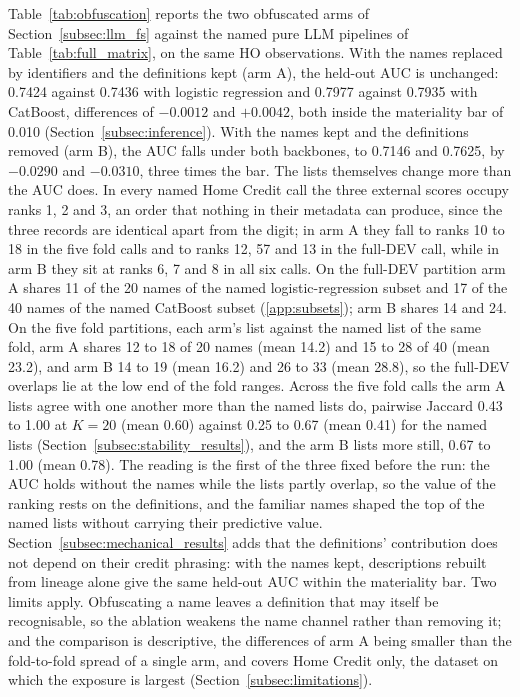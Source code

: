 \documentclass[final,5p,twocolumn]{elsarticle}
\newcommand{\Kfeat}{K}
\begin{document}
Table~\ref{tab:obfuscation} reports the two obfuscated arms of Section~\ref{subsec:llm_fs} against the named pure LLM pipelines of Table~\ref{tab:full_matrix}, on the same HO observations. With the names replaced by identifiers and the definitions kept (arm A), the held-out AUC is unchanged: 0.7424 against 0.7436 with logistic regression and 0.7977 against 0.7935 with CatBoost, differences of $-0.0012$ and $+0.0042$, both inside the materiality bar of 0.010 (Section~\ref{subsec:inference}). With the names kept and the definitions removed (arm B), the AUC falls under both backbones, to 0.7146 and 0.7625, by $-0.0290$ and $-0.0310$, three times the bar. The lists themselves change more than the AUC does. In every named Home Credit call the three external scores occupy ranks 1, 2 and 3, an order that nothing in their metadata can produce, since the three records are identical apart from the digit; in arm A they fall to ranks 10 to 18 in the five fold calls and to ranks 12, 57 and 13 in the full-DEV call, while in arm B they sit at ranks 6, 7 and 8 in all six calls. On the full-DEV partition arm A shares 11 of the 20 names of the named logistic-regression subset and 17 of the 40 names of the named CatBoost subset (\ref{app:subsets}); arm B shares 14 and 24. On the five fold partitions, each arm's list against the named list of the same fold, arm A shares 12 to 18 of 20 names (mean 14.2) and 15 to 28 of 40 (mean 23.2), and arm B 14 to 19 (mean 16.2) and 26 to 33 (mean 28.8), so the full-DEV overlaps lie at the low end of the fold ranges. Across the five fold calls the arm A lists agree with one another more than the named lists do, pairwise Jaccard 0.43 to 1.00 at $\Kfeat=20$ (mean 0.60) against 0.25 to 0.67 (mean 0.41) for the named lists (Section~\ref{subsec:stability_results}), and the arm B lists more still, 0.67 to 1.00 (mean 0.78). The reading is the first of the three fixed before the run: the AUC holds without the names while the lists partly overlap, so the value of the ranking rests on the definitions, and the familiar names shaped the top of the named lists without carrying their predictive value. Section~\ref{subsec:mechanical_results} adds that the definitions' contribution does not depend on their credit phrasing: with the names kept, descriptions rebuilt from lineage alone give the same held-out AUC within the materiality bar. Two limits apply. Obfuscating a name leaves a definition that may itself be recognisable, so the ablation weakens the name channel rather than removing it; and the comparison is descriptive, the differences of arm A being smaller than the fold-to-fold spread of a single arm, and covers Home Credit only, the dataset on which the exposure is largest (Section~\ref{subsec:limitations}).
\end{document}
